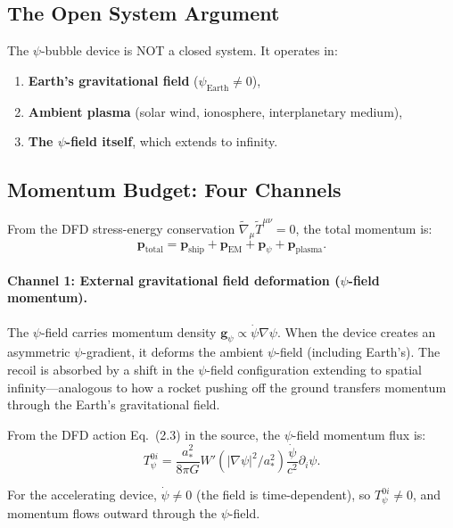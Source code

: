 \documentclass[12pt, letterpaper]{article}
\theoremstyle{definition}
\theoremstyle{remark}
\begin{document}
\subsection{The Open System Argument}

The $\psi$-bubble device is NOT a closed system. It operates in:
\begin{enumerate}
\item \textbf{Earth's gravitational field} ($\psi_{\mathrm{Earth}} \neq 0$),
\item \textbf{Ambient plasma} (solar wind, ionosphere, interplanetary medium),
\item \textbf{The $\psi$-field itself}, which extends to infinity.
\end{enumerate}

\subsection{Momentum Budget: Four Channels}

From the DFD stress-energy conservation
$\tilde{\nabla}_\mu \tilde{T}^{\mu\nu} = 0$, the total momentum is:
\begin{equation}
\mathbf{p}_{\mathrm{total}} = \mathbf{p}_{\mathrm{ship}}
+ \mathbf{p}_{\mathrm{EM}}
+ \mathbf{p}_{\psi}
+ \mathbf{p}_{\mathrm{plasma}}.
\end{equation}

\paragraph{Channel 1: External gravitational field deformation
($\psi$-field momentum).}

The $\psi$-field carries momentum density
$\mathbf{g}_\psi \propto \dot{\psi} \nabla\psi$. When the device creates an
asymmetric $\psi$-gradient, it deforms the ambient $\psi$-field (including
Earth's). The recoil is absorbed by a shift in the $\psi$-field configuration
extending to spatial infinity---analogous to how a rocket pushing off the
ground transfers momentum through the Earth's gravitational field.

From the DFD action Eq.~(2.3) in the source, the $\psi$-field momentum flux is:
\begin{equation}
T^{0i}_\psi = \frac{a_*^2}{8\pi G} W'(|\nabla\psi|^2/a_*^2)
\frac{\dot{\psi}}{c^2} \partial_i \psi.
\end{equation}

For the accelerating device, $\dot{\psi} \neq 0$ (the field is time-dependent),
so $T^{0i}_\psi \neq 0$, and momentum flows outward through the $\psi$-field.
\end{document}
